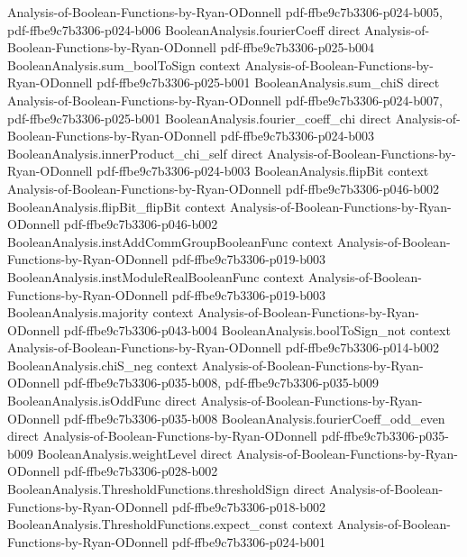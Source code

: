 \begin{lemma}
  {Analysis-of-Boolean-Functions-by-Ryan-ODonnell}
  {pdf-ffbe9c7b3306-p024-b005,
    pdf-ffbe9c7b3306-p024-b006}
\proofstep
  {BooleanAnalysis.fourierCoeff}
  {direct}
  {Analysis-of-Boolean-Functions-by-Ryan-ODonnell}
  {pdf-ffbe9c7b3306-p025-b004}
\proofstep
  {BooleanAnalysis.sum_boolToSign}
  {context}
  {Analysis-of-Boolean-Functions-by-Ryan-ODonnell}
  {pdf-ffbe9c7b3306-p025-b001}
\proofstep
  {BooleanAnalysis.sum_chiS}
  {direct}
  {Analysis-of-Boolean-Functions-by-Ryan-ODonnell}
  {pdf-ffbe9c7b3306-p024-b007,
    pdf-ffbe9c7b3306-p025-b001}
\proofstep
  {BooleanAnalysis.fourier_coeff_chi}
  {direct}
  {Analysis-of-Boolean-Functions-by-Ryan-ODonnell}
  {pdf-ffbe9c7b3306-p024-b003}
\proofstep
  {BooleanAnalysis.innerProduct_chi_self}
  {direct}
  {Analysis-of-Boolean-Functions-by-Ryan-ODonnell}
  {pdf-ffbe9c7b3306-p024-b003}
\proofstep
  {BooleanAnalysis.flipBit}
  {context}
  {Analysis-of-Boolean-Functions-by-Ryan-ODonnell}
  {pdf-ffbe9c7b3306-p046-b002}
\proofstep
  {BooleanAnalysis.flipBit_flipBit}
  {context}
  {Analysis-of-Boolean-Functions-by-Ryan-ODonnell}
  {pdf-ffbe9c7b3306-p046-b002}
\proofstep
  {BooleanAnalysis.instAddCommGroupBooleanFunc}
  {context}
  {Analysis-of-Boolean-Functions-by-Ryan-ODonnell}
  {pdf-ffbe9c7b3306-p019-b003}
\proofstep
  {BooleanAnalysis.instModuleRealBooleanFunc}
  {context}
  {Analysis-of-Boolean-Functions-by-Ryan-ODonnell}
  {pdf-ffbe9c7b3306-p019-b003}
\proofstep
  {BooleanAnalysis.majority}
  {context}
  {Analysis-of-Boolean-Functions-by-Ryan-ODonnell}
  {pdf-ffbe9c7b3306-p043-b004}
\proofstep
  {BooleanAnalysis.boolToSign_not}
  {context}
  {Analysis-of-Boolean-Functions-by-Ryan-ODonnell}
  {pdf-ffbe9c7b3306-p014-b002}
\proofstep
  {BooleanAnalysis.chiS_neg}
  {context}
  {Analysis-of-Boolean-Functions-by-Ryan-ODonnell}
  {pdf-ffbe9c7b3306-p035-b008,
    pdf-ffbe9c7b3306-p035-b009}
\proofstep
  {BooleanAnalysis.isOddFunc}
  {direct}
  {Analysis-of-Boolean-Functions-by-Ryan-ODonnell}
  {pdf-ffbe9c7b3306-p035-b008}
\proofstep
  {BooleanAnalysis.fourierCoeff_odd_even}
  {direct}
  {Analysis-of-Boolean-Functions-by-Ryan-ODonnell}
  {pdf-ffbe9c7b3306-p035-b009}
\proofstep
  {BooleanAnalysis.weightLevel}
  {direct}
  {Analysis-of-Boolean-Functions-by-Ryan-ODonnell}
  {pdf-ffbe9c7b3306-p028-b002}
\proofstep
  {BooleanAnalysis.ThresholdFunctions.thresholdSign}
  {direct}
  {Analysis-of-Boolean-Functions-by-Ryan-ODonnell}
  {pdf-ffbe9c7b3306-p018-b002}
\proofstep
  {BooleanAnalysis.ThresholdFunctions.expect_const}
  {context}
  {Analysis-of-Boolean-Functions-by-Ryan-ODonnell}
  {pdf-ffbe9c7b3306-p024-b001}
\proofstep

\end{lemma}
